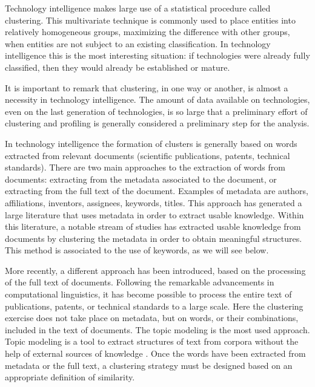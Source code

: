 \documentclass[]{book}
\begin{document}
Technology intelligence makes large use of a statistical procedure
called clustering. This multivariate technique is commonly used to place
entities into relatively homogeneous groups, maximizing the difference
with other groups, when entities are not subject to an existing
classification. In technology intelligence this is the most interesting
situation: if technologies were already fully classified, then they
would already be established or mature.

It is important to remark that clustering, in one way or another, is
almost a necessity in technology intelligence. The amount of data
available on technologies, even on the last generation of technologies,
is so large that a preliminary effort of clustering and profiling is
generally considered a preliminary step for the analysis.

In technology intelligence the formation of clusters is generally based
on words extracted from relevant documents (scientific publications,
patents, technical standards). There are two main approaches to the
extraction of words from documents: extracting from the metadata
associated to the document, or extracting from the full text of the
document. Examples of metadata are authors, affiliations, inventors,
assignees, keywords, titles. This approach has generated a large
literature that uses metadata in order to extract usable knowledge.
Within this literature, a notable stream of studies has extracted usable
knowledge from documents by clustering the metadata in order to obtain
meaningful structures. This method is associated to the use of keywords,
as we will see below.

More recently, a different approach has been introduced, based on the
processing of the full text of documents. Following the remarkable
advancements in computational linguistics, it has become possible to
process the entire text of publications, patents, or technical standards
to a large scale. Here the clustering exercise does not take place on
metadata, but on words, or their combinations, included in the text of
documents. The topic modeling is the most used approach. Topic modeling
is a tool to extract structures of text from corpora without the help of
external sources of knowledge \citep{blei2003latent}. Once the words
have been extracted from metadata or the full text, a clustering
strategy must be designed based on an appropriate definition of
similarity.
\end{document}
